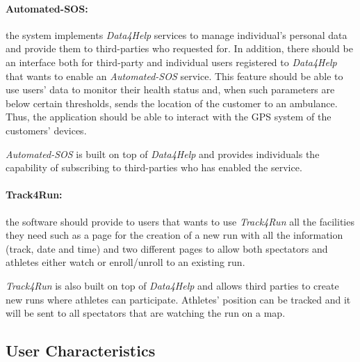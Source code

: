 \documentclass[a4paper]{article}
\begin{document}
    \paragraph{Automated-SOS:} the system implements \textit{Data4Help} services to manage individual's personal data and provide them to third-parties who requested for. In addition, there should be an interface both for third-party and individual users registered to \textit{Data4Help} that wants to enable an \textit{Automated-SOS} service. This feature should be able to use users' data to monitor their health status and, when such parameters are below certain thresholds, sends the location of the customer to an ambulance. Thus, the application should be able to interact with the GPS system of the customers' devices.
    
    \textit{Automated-SOS} is built on top of \textit{Data4Help} and provides individuals the capability of subscribing to third-parties who has enabled the service.
    
    \paragraph{Track4Run: } the software should provide to users that wants to use \textit{Track4Run} all the facilities they need such as a page for the creation of a new run with all the information (track, date and time) and two different pages to allow both spectators and athletes either watch or enroll/unroll to an existing run.
    
    \textit{Track4Run} is also built on top of \textit{Data4Help} and allows third parties to create new runs where athletes can participate. Athletes' position can be tracked and it will be sent to all spectators that are watching the run on a map.
    
    \subsection{User Characteristics}
\end{document}
